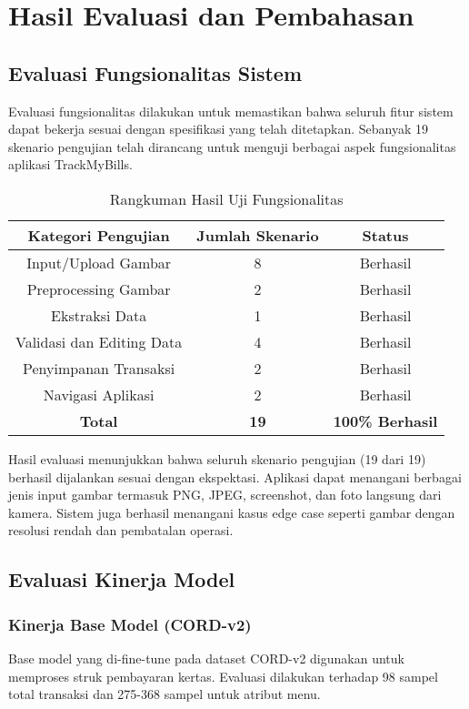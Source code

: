 \section{Hasil Evaluasi dan Pembahasan}

\subsection{Evaluasi Fungsionalitas Sistem}
Evaluasi fungsionalitas dilakukan untuk memastikan bahwa seluruh fitur sistem dapat bekerja sesuai dengan spesifikasi yang telah ditetapkan. Sebanyak 19 skenario pengujian telah dirancang untuk menguji berbagai aspek fungsionalitas aplikasi TrackMyBills.

\begin{table}[htbp]
\centering
\caption{Rangkuman Hasil Uji Fungsionalitas}
\label{tab:functional-summary}
\begin{tabular}{|c|c|c|}
\hline
\textbf{Kategori Pengujian} & \textbf{Jumlah Skenario} & \textbf{Status} \\
\hline
Input/Upload Gambar & 8 & Berhasil \\
\hline
Preprocessing Gambar & 2 & Berhasil \\
\hline
Ekstraksi Data & 1 & Berhasil \\
\hline
Validasi dan Editing Data & 4 & Berhasil \\
\hline
Penyimpanan Transaksi & 2 & Berhasil \\
\hline
Navigasi Aplikasi & 2 & Berhasil \\
\hline
\textbf{Total} & \textbf{19} & \textbf{100\% Berhasil} \\
\hline
\end{tabular}
\end{table}

Hasil evaluasi menunjukkan bahwa seluruh skenario pengujian (19 dari 19) berhasil dijalankan sesuai dengan ekspektasi. Aplikasi dapat menangani berbagai jenis input gambar termasuk PNG, JPEG, screenshot, dan foto langsung dari kamera. Sistem juga berhasil menangani kasus edge case seperti gambar dengan resolusi rendah dan pembatalan operasi.

\subsection{Evaluasi Kinerja Model}

\subsubsection{Kinerja Base Model (CORD-v2)}
Base model yang di-fine-tune pada dataset CORD-v2 digunakan untuk memproses struk pembayaran kertas. Evaluasi dilakukan terhadap 98 sampel total transaksi dan 275-368 sampel untuk atribut menu.

